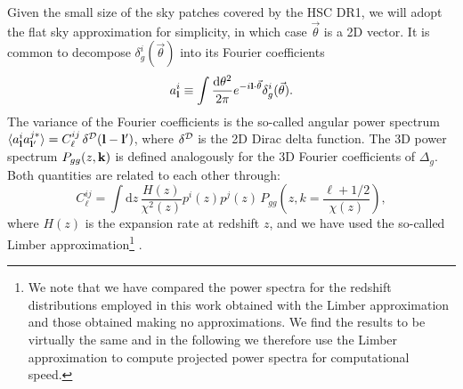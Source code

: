 \documentclass[a4paper,11pt]{article}
\newcommand{\nv}{\vec{\theta}}
\begin{document}
    Given the small size of the sky patches covered by the HSC DR1, we will adopt the flat sky approximation for simplicity, in which case $\nv$ is a 2D vector. It is common to decompose $\delta^i_g(\nv)$ into its Fourier coefficients
    \begin{equation}
      a^i_{\bf l}\equiv \int\frac{\mathrm{d}\theta^2}{2\pi}e^{-i{\bf l}\cdot\nv}\delta^i_g(\nv).
    \end{equation}
    The variance of the Fourier coefficients is the so-called angular power spectrum $\langle a^i_{\bf l}a^{j*}_{{\bf l}'}\rangle = C^{ij}_\ell\,\delta^{\cal D}({\bf l}-{\bf l}')$, where $\delta^{\cal D}$ is the 2D Dirac delta function. The 3D power spectrum $P_{gg}(z,{\bf k})$ is defined analogously for the 3D Fourier coefficients of $\Delta_g$. Both quantities are related to each other through:
    \begin{equation}\label{eq:cell_gg_limber}
      C^{ij}_\ell = \int \mathrm{d}z\,\frac{H(z)}{\chi^2(z)} p^i(z)p^j(z)\,P_{gg}\left(z,k=\frac{\ell+1/2}{\chi(z)}\right),
    \end{equation}
    where $H(z)$ is the expansion rate at redshift $z$, and we have used the so-called Limber approximation\footnote{We note that we have compared the power spectra for the redshift distributions employed in this work obtained with the Limber approximation and those obtained making no approximations. We find the results to be virtually the same and in the following we therefore use the Limber approximation to compute projected power spectra for computational speed.} \citep{Limber:1953, Kaiser:1992, Kaiser:1998}.
\end{document}
